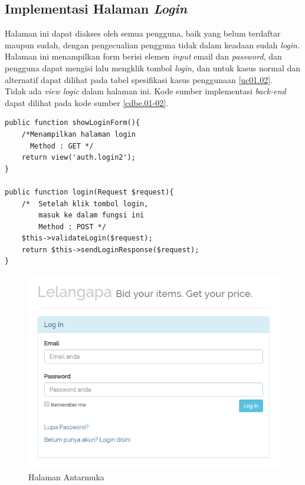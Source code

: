 \subsection{Implementasi Halaman \textit{Login}}
Halaman ini dapat diakses oleh semua pengguna, baik yang belum terdaftar maupun sudah, dengan pengecualian pengguna tidak dalam keadaan sudah \textit{login}. Halaman ini menampilkan form berisi elemen \textit{input} email dan \textit{password}, dan pengguna dapat mengisi lalu mengklik tombol \textit{login}, dan untuk kasus normal dan alternatif dapat dilihat pada tabel spesifikasi kasus penggunaan \ref{uc01.02}.\\
\indent Tidak ada \textit{view logic} dalam halaman ini. Kode sumber implementasi \textit{back-end} dapat dilihat pada kode sumber \ref{cdbe.01-02}.

\begin{lstlisting}[label=cdbe.01-02,style=php,caption=Kode Sumber Antarmuka Registrasi]
public function showLoginForm(){
	/*Menampilkan halaman login
	  Method : GET */
	return view('auth.login2');
}

public function login(Request $request){
	/*	Setelah klik tombol login,
		masuk ke dalam fungsi ini
		Method : POST */
	$this->validateLogin($request);
	return $this->sendLoginResponse($request);
}

\end{lstlisting}

\begin{figure}[H]
	\centering
	\includegraphics[width=\textwidth]{images/bab4/ui/01-02.png}
	\caption{Halaman Antarmuka }
	\label{ui.01-01}
\end{figure}

